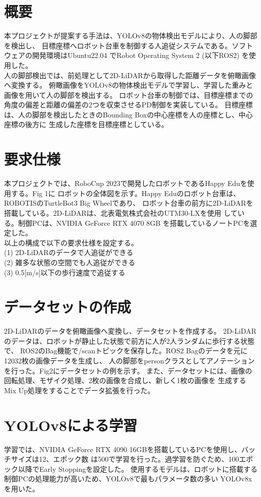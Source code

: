 \section{概要}
本プロジェクトが提案する手法は、YOLOv8の物体検出モデルにより、人の脚部を検出し、
目標座標へロボット台車を制御する人追従システムである。ソフトウェアの開発環境はUbuntu22.04
でRobot Operating System 2 (以下ROS2) を使用した。\\ \indent
人の脚部検出では、前処理として2D-LiDARから取得した距離データを俯瞰画像へ変換する。
俯瞰画像をYOLOv8の物体検出モデルで学習し、学習した重みと画像を用いて人の脚部を検出する。
ロボット台車の制御では、目標座標までの角度の偏差と距離の偏差の2つを収束させるPD制御を実装している。
目標座標は、人の脚部を検出したときのBounding Boxの中心座標を人の座標とし、中心座標の後方に
生成した座標を目標座標としている。

\section{要求仕様}
本プロジェクトでは、RoboCup 2023で開発したロボットであるHappy Eduを使用する。Fig 1に
ロボットの全体図を示す。Happy Eduのロボット台車は、ROBOTISのTurtleBot3 Big Wheelであり、
ロボット台車の前方に2D-LiDARを搭載している。2D-LiDARは、北表電気株式会社のUTM30-LXを使用
している。制御PCは、NVIDIA GeForce RTX 4070 8GB を搭載しているノートPCを選定した。\\ \indent
以上の構成で以下の要求仕様を設定する。\\
(1) 2D-LiDARのデータで人追従ができる \\
(2) 雑多な状態の空間でも人追従ができる \\
(3) 0.5[m/s]以下の歩行速度で追従する \\

\section{データセットの作成}
2D-LiDARのデータを俯瞰画像へ変換し、データセットを作成する。
2D-LiDAR のデータは、ロボットが静止した状態で前方に人が2人ランダムに歩行する状態で、
ROS2のBag機能で/scanトピックを保存した。ROS2 Bagのデータを元に12032枚の画像データを生成し、
人の脚部をpersonクラスとしてアノテーションを行った。Fig2にデータセットの例を示す。
また、データセットには、画像の回転処理、モザイク処理、2枚の画像を合成し、新しく1枚の画像を
生成するMix Up処理をすることでデータ拡張を行った。

\section{YOLOv8による学習}
学習では、NVIDIA GeForce RTX 4090 16GBを搭載しているPCを使用し、バッチサイズは12、エポック数
は500で学習を行った。過学習を防ぐため、100エポック以降でEarly Stoppingを設定した。
使用するモデルは、ロボットに搭載する制御PCの処理能力が高いため、YOLOv8で最もパラメータ数の多い
YOLOv8xを用いた。

